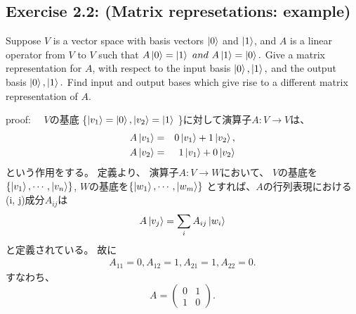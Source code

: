 \begin{flushleft}
\section{\Large Exercise 2.2: (Matrix represetations: example)}
 Suppose $V$ is a vector space with basis vectors $\ket{0}$ and $\ket{1}$,
and $A$ is a linear operator from $V$ to $V$ such that 
$A\ket{0} = \ket{1} ~and~ A\ket{1} = \ket{0}.$ 
Give a matrix representation for $A$, with respect to the input basis 
$\ket{0}, \ket{1},$ and the output basis $\ket{0}, \ket{1}.$ 
Find input and output bases which give rise to a different matrix representation of $A$.

\vspace{0.1in}
{\large proof:}
　$V$の基底
\{$
 \ket{v_1} = \ket{0}, \ket{v_2}=\ket{1} 
$
\}に対して演算子$A:V \to V $は、
\setcounter{equation}{0}
\begin{eqnarray*}
A\ket{v_1} &=& 0\ket{v_1} + 1\ket{v_2},\\
A\ket{v_2} &=& 1\ket{v_1} + 0\ket{v_2}
\end{eqnarray*}
という作用をする。
\newline
定義より、
\color{red}
演算子$A:V \to W $において、
$V$の基底を$\{\ket{v_1},\cdots, \ket{v_n}\}$, 
$W$の基底を$\{\ket{w_1},\cdots, \ket{w_m}\}$
とすれば、$A$の行列表現における(i, j)成分$A_{ij}$は
\begin{eqnarray}
A\ket{v_j} = \sum_{i} A_{ij} \ket{w_i}
\end{eqnarray}
と定義されている。
\color{black}
 故に
\begin{eqnarray*}
A_{11}=0,
A_{12}=1,
A_{21}=1,
A_{22}=0.
\end{eqnarray*}
\newline
すなわち、
\[
A = \left(
	\begin{array}{cc}
	0 & 1\\
	1 & 0
	\end{array}
	\right).
\]

 \end{flushleft}

